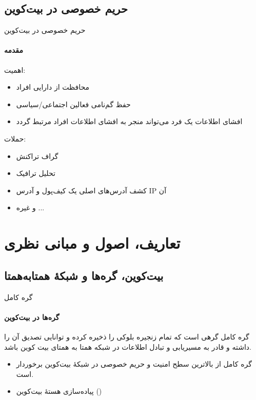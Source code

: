 \documentclass{beamer}
\begin{document}
\subsection{حریم خصوصی در بیت‌کوین}
\begin{frame}{حریم خصوصی در بیت‌کوین}
\framesubtitle{مقدمه}
{\large اهمیت:}
	\begin{itemize}
		\item{محافظت از دارایی افراد}
		\item{حفظ گم‌نامی فعالین اجتماعی/سیاسی}
		\item{افشای اطلاعات یک فرد می‌تواند منجر به افشای اطلاعات افراد مرتبط گردد}
	\end{itemize}

{\large حملات:}
	\begin{itemize}
		\item{گراف تراکنش}
		\item{تحلیل ترافیک}
		\item{%
			کشف آدرس‌های اصلی یک کیف‌پول و آدرس IP آن}
		\item{%
		و غیره ...}
	\end{itemize}
\end{frame}

\section{تعاریف، اصول و مبانی نظری\hfill}
\subsection{بیت‌کوین، گره‌ها و شبکهٔ همتا‌به‌همتا}

\begin{frame}{گره کامل}
	\framesubtitle{گره‌ها در بیت‌کوین}
	
	\begin{definition}
		گره کامل گرهی است که تمام زنجیره بلوکی را ذخیره کرده و توانایی تصدیق آن را داشته و قادر به
 مسیریابی و تبادل اطلاعات در شبکه همتا به همتای بیت کوین باشد.
	\end{definition}
\begin{itemize}
	\item{%
	گره کامل از بالاترین سطح امنیت و حریم خصوصی در شبکهٔ بیت‌کوین برخوردار است.}
	\item{%
	پیاده‌سازی هستهٔ بیت‌کوین ()
} 

\end{itemize}
\end{frame}
\end{document}
